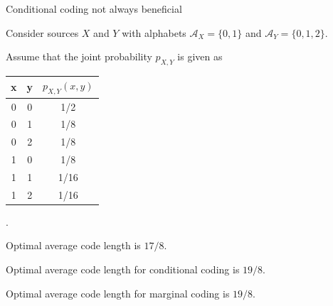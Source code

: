 \begin{frame}{Conditional coding not always beneficial}
\bit
\item Consider sources $X$ and $Y$ with alphabets $\mathcal{A}_X=\{0,1\}$ and $\mathcal{A}_Y=\{0,1,2\}$. 
\item Assume that the joint probability $p_{X,Y}$ is given as
\begin{center} 
 \begin{tabular}[hbt!]{ |c|c|c| } 
 \hline
 x & y & $p_{X,Y}(x,y)$ \\
 \hline 
0 & 0 & 1/2\\  
0 & 1 & 1/8\\
0 & 2 &  1/8\\
1 & 0 & 1/8\\
1 & 1 &  1/16\\
1& 2& 1/16\\
 \hline
\end{tabular}.
\end{center}
\eit
{}
\bit
\item Optimal average code length is $17/8$.
\item Optimal average code length for conditional coding is $19/8$.
\item Optimal average code length for marginal coding is $19/8$.
\eit 
\end{frame}



